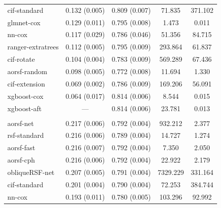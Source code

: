 \documentclass{article}\usepackage[]{graphicx}\usepackage[]{xcolor}
\newenvironment{knitrout}{}{} %
\begin{document}
\begin{knitrout}
\begin{longtable}[t]{lcccc}
\hspace{1em}cif-standard & 0.132 (0.005) & 0.809 (0.007) & 71.835 & 371.102\\
\hspace{1em}glmnet-cox & 0.129 (0.011) & 0.795 (0.008) & 1.473 & 0.011\\
\hspace{1em}nn-cox & 0.117 (0.029) & 0.786 (0.046) & 51.356 & 84.715\\
\hspace{1em}ranger-extratrees & 0.112 (0.005) & 0.795 (0.009) & 293.864 & 61.837\\
\hspace{1em}cif-rotate & 0.104 (0.004) & 0.783 (0.009) & 569.289 & 67.436\\
\hspace{1em}aorsf-random & 0.098 (0.005) & 0.772 (0.008) & 11.694 & 1.330\\
\hspace{1em}cif-extension & 0.069 (0.002) & 0.786 (0.009) & 169.206 & 56.091\\
\hspace{1em}xgboost-cox & 0.064 (0.017) & 0.814 (0.006) & 8.544 & 0.015\\
\hspace{1em}xgboost-aft & --- & 0.814 (0.006) & 23.781 & 0.013\\
\addlinespace[0.3em]
\multicolumn{5}{l}{\textit{\textbf{ARIC; death, n = 13623, p = 41}}}\\
\hline
\hspace{1em}aorsf-net & 0.217 (0.006) & 0.792 (0.004) & 932.212 & 2.377\\
\hspace{1em}rsf-standard & 0.216 (0.006) & 0.789 (0.004) & 14.727 & 1.274\\
\hspace{1em}aorsf-fast & 0.216 (0.007) & 0.792 (0.004) & 7.350 & 2.050\\
\hspace{1em}aorsf-cph & 0.216 (0.006) & 0.792 (0.004) & 22.922 & 2.179\\
\hspace{1em}obliqueRSF-net & 0.207 (0.005) & 0.791 (0.004) & 7329.229 & 331.164\\
\hspace{1em}cif-standard & 0.201 (0.004) & 0.790 (0.004) & 72.253 & 384.744\\
\hspace{1em}nn-cox & 0.193 (0.011) & 0.780 (0.005) & 103.296 & 92.992\\

\end{longtable}
\end{knitrout}
\end{document}
